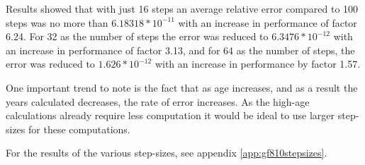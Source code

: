 Results showed that with just 16 steps an average relative error compared to 100 steps was no more than $6.18318 * 10^{-11}$ with an increase in performance of factor 6.24.
For 32 as the number of steps the error was reduced to $6.3476 * 10^{-12}$ with an increase in performance of factor 3.13, and for 64 as the number of steps, the error was reduced to $1.626 * 10^{-12}$ with an increase in performance by factor 1.57.

One important trend to note is the fact that as age increases, and as a result the years calculated decreases, the rate of error increases.
As the high-age calculations already require less computation it would be ideal to use larger step-sizes for these computations.

For the results of the various step-sizes, see appendix \ref{app:gf810stepsizes}.

